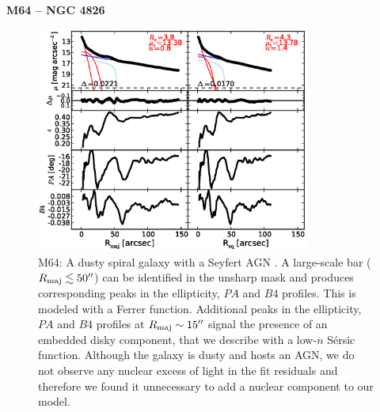 \documentclass[preprint2]{emulateapj}
\newcommand{\fitfigurewidth}{0.8\textwidth}
\begin{document}
  \clearpage\newpage\noindent
  {\bf M64 -- NGC 4826 \\}
  
  \begin{figure}[h]
  \begin{center}
  \includegraphics[width=\fitfigurewidth]{m64_1Dfit.eps}
  \caption{M64: 
  A dusty spiral galaxy with a Seyfert AGN \citep{veroncettyveron2006}. 
  A large-scale bar ($R_{\rm maj} \lesssim 50''$) can be identified in the unsharp mask 
  and produces corresponding peaks in the ellipticity, $PA$ and $B4$ profiles.
  This is modeled with a Ferrer function.
  Additional peaks in the ellipticity, $PA$ and $B4$ profiles at $R_{\rm maj} \sim 15''$ 
  signal the presence of an embedded disky component, that we describe with a low-$n$ S\'ersic function.
  Although the galaxy is dusty and hosts an AGN, we do not observe any nuclear excess of light 
  in the fit residuals and therefore we found it unnecessary to add a nuclear component to our model. 
  }
  \end{center}
  \end{figure}
\end{document}
